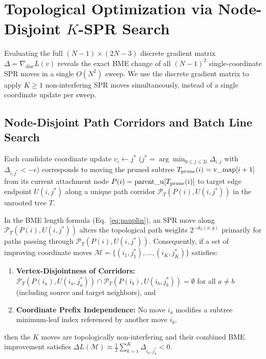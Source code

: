 \documentclass[11pt,a4paper]{article}
\makeatletter
\DeclareRobustCommand{\_}{\ifmmode\nfss@text{\textunderscore}\else\textunderscore\allowbreak\fi}
\theoremstyle{definition}
\makeatother
\begin{document}
\section{Topological Optimization via Node-Disjoint $K$-SPR Search}
\label{sec:optimizer}

Evaluating the full $(N-1) \times (2N-3)$ discrete gradient matrix $\Delta = \nabla_{\text{disc}} L(v)$ reveals the exact BME change of all $(N-1)^2$ single-coordinate SPR moves in a single $O(N^2)$ sweep. We use the discrete gradient matrix to apply $K \ge 1$ non-interfering SPR moves simultaneously, instead of a single coordinate update per sweep.

\subsection{Node-Disjoint Path Corridors and Batch Line Search}
Each candidate coordinate update $v_i \leftarrow j^*$ ($j^* = \arg\min_{0 \le j \le 2i} \Delta_{i, j}$ with $\Delta_{i, j^*} < -\epsilon$) corresponds to moving the pruned subtree $T_{\text{prune}}(i) = \text{v\_map}[i+1]$ from its current attachment node $P(i) = \text{parent\_u}[T_{\text{prune}}(i)]$ to target edge endpoint $U(i, j^*)$ along a unique path corridor $\mathcal{P}_T(P(i), U(i, j^*))$ in the unrooted tree $T$.

In the BME length formula (Eq.~\eqref{eq:pauplin}), an SPR move along $\mathcal{P}_T(P(i), U(i, j^*))$ alters the topological path weights $2^{-d_T(x,y)}$ primarily for paths passing through $\mathcal{P}_T(P(i), U(i, j^*))$. Consequently, if a set of improving coordinate moves $\mathcal{M} = \{(i_1, j_1^*), \dots, (i_K, j_K^*)\}$ satisfies:
\begin{enumerate}
    \item \textbf{Vertex-Disjointness of Corridors:} $\mathcal{P}_T(P(i_a), U(i_a, j_a^*)) \cap \mathcal{P}_T(P(i_b), U(i_b, j_b^*)) = \emptyset$ for all $a \neq b$ (including source and target neighbors), and
    \item \textbf{Coordinate Prefix Independence:} No move $i_a$ modifies a subtree minimum-leaf index referenced by another move $i_b$,
\end{enumerate}
then the $K$ moves are topologically non-interfering and their combined BME improvement satisfies $\Delta L(\mathcal{M}) \approx \frac{1}{2} \sum_{k=1}^K \Delta_{i_k, j_k^*} < 0$.
\end{document}
